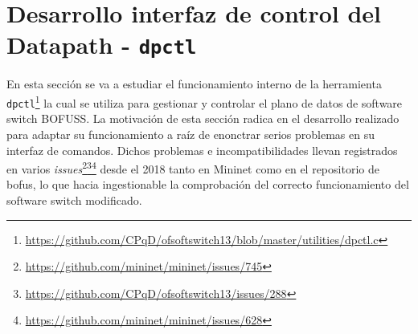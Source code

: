 \section{Desarrollo interfaz de control del Datapath - \texttt{dpctl}}
\label{sec:dpctl}

En esta sección se va a estudiar el funcionamiento interno de la herramienta \texttt{dpctl}\footnote{\url{https://github.com/CPqD/ofsoftswitch13/blob/master/utilities/dpctl.c}} la cual se utiliza para gestionar y controlar el plano de datos de software switch BOFUSS. La motivación de esta sección radica en el desarrollo realizado para adaptar su funcionamiento a raíz de enonctrar serios problemas en su interfaz de comandos. Dichos problemas e incompatibilidades llevan registrados en varios \textit{issues}\footnote{\url{https://github.com/mininet/mininet/issues/745}}\footnote{\url{https://github.com/CPqD/ofsoftswitch13/issues/288}}\footnote{\url{https://github.com/mininet/mininet/issues/628}} desde el 2018 tanto en Mininet como en el repositorio de \gls{bofus}, lo que hacia ingestionable la comprobación del correcto funcionamiento del software switch modificado.